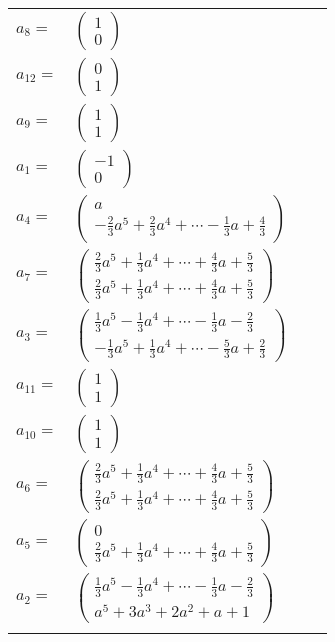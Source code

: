 \documentclass[1p]{elsarticle_modified}
\theoremstyle{definition}
\begin{document}
\begin{tabular}{m{7pt} m{180pt} m{7pt} m{180pt} }
\flushright $a_{8}=$&$\begin{pmatrix}1\\0\end{pmatrix}$ \\
\flushright $a_{12}=$&$\begin{pmatrix}0\\1\end{pmatrix}$ \\
\flushright $a_{9}=$&$\begin{pmatrix}1\\1\end{pmatrix}$ \\
\flushright $a_{1}=$&$\begin{pmatrix}-1\\0\end{pmatrix}$ \\
\flushright $a_{4}=$&$\begin{pmatrix}a\\-\frac{2}{3} a^5+\frac{2}{3} a^4+\cdots-\frac{1}{3} a+\frac{4}{3}\end{pmatrix}$ \\
\flushright $a_{7}=$&$\begin{pmatrix}\frac{2}{3} a^5+\frac{1}{3} a^4+\cdots+\frac{4}{3} a+\frac{5}{3}\\\frac{2}{3} a^5+\frac{1}{3} a^4+\cdots+\frac{4}{3} a+\frac{5}{3}\end{pmatrix}$ \\
\flushright $a_{3}=$&$\begin{pmatrix}\frac{1}{3} a^5-\frac{1}{3} a^4+\cdots-\frac{1}{3} a-\frac{2}{3}\\-\frac{1}{3} a^5+\frac{1}{3} a^4+\cdots-\frac{5}{3} a+\frac{2}{3}\end{pmatrix}$ \\
\flushright $a_{11}=$&$\begin{pmatrix}1\\1\end{pmatrix}$ \\
\flushright $a_{10}=$&$\begin{pmatrix}1\\1\end{pmatrix}$ \\
\flushright $a_{6}=$&$\begin{pmatrix}\frac{2}{3} a^5+\frac{1}{3} a^4+\cdots+\frac{4}{3} a+\frac{5}{3}\\\frac{2}{3} a^5+\frac{1}{3} a^4+\cdots+\frac{4}{3} a+\frac{5}{3}\end{pmatrix}$ \\
\flushright $a_{5}=$&$\begin{pmatrix}0\\\frac{2}{3} a^5+\frac{1}{3} a^4+\cdots+\frac{4}{3} a+\frac{5}{3}\end{pmatrix}$ \\
\flushright $a_{2}=$&$\begin{pmatrix}\frac{1}{3} a^5-\frac{1}{3} a^4+\cdots-\frac{1}{3} a-\frac{2}{3}\\a^5+3 a^3+2 a^2+a+1\end{pmatrix}$\\&\end{tabular}
\end{document}
